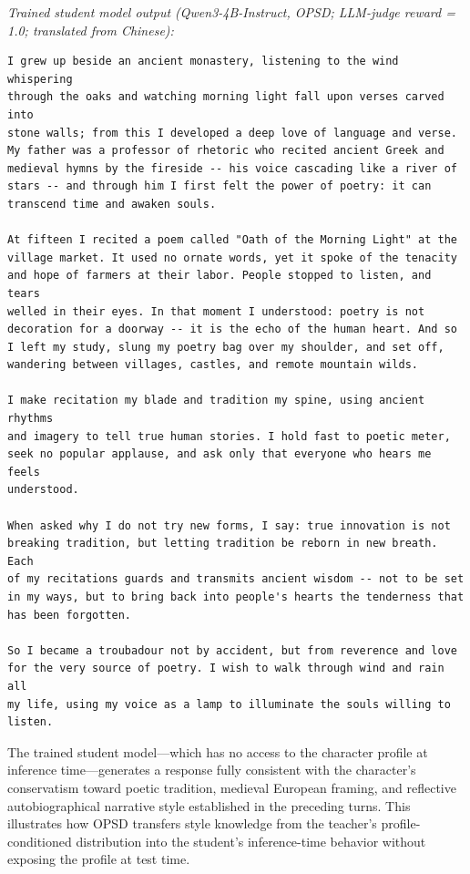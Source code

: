 \noindent\textit{Trained student model output (Qwen3-4B-Instruct, OPSD; LLM-judge reward = 1.0; translated from Chinese):}
\begin{responsebox}
\begin{Verbatim}[breaklines=true, breakanywhere=true, fontsize=\small]
I grew up beside an ancient monastery, listening to the wind whispering
through the oaks and watching morning light fall upon verses carved into
stone walls; from this I developed a deep love of language and verse.
My father was a professor of rhetoric who recited ancient Greek and
medieval hymns by the fireside -- his voice cascading like a river of
stars -- and through him I first felt the power of poetry: it can
transcend time and awaken souls.

At fifteen I recited a poem called "Oath of the Morning Light" at the
village market. It used no ornate words, yet it spoke of the tenacity
and hope of farmers at their labor. People stopped to listen, and tears
welled in their eyes. In that moment I understood: poetry is not
decoration for a doorway -- it is the echo of the human heart. And so
I left my study, slung my poetry bag over my shoulder, and set off,
wandering between villages, castles, and remote mountain wilds.

I make recitation my blade and tradition my spine, using ancient rhythms
and imagery to tell true human stories. I hold fast to poetic meter,
seek no popular applause, and ask only that everyone who hears me feels
understood.

When asked why I do not try new forms, I say: true innovation is not
breaking tradition, but letting tradition be reborn in new breath. Each
of my recitations guards and transmits ancient wisdom -- not to be set
in my ways, but to bring back into people's hearts the tenderness that
has been forgotten.

So I became a troubadour not by accident, but from reverence and love
for the very source of poetry. I wish to walk through wind and rain all
my life, using my voice as a lamp to illuminate the souls willing to
listen.
\end{Verbatim}
\end{responsebox}

The trained student model---which has no access to the character profile at inference time---generates a response fully consistent with the character's conservatism toward poetic tradition, medieval European framing, and reflective autobiographical narrative style established in the preceding turns.
This illustrates how OPSD transfers style knowledge from the teacher's profile-conditioned distribution into the student's inference-time behavior without exposing the profile at test time.



